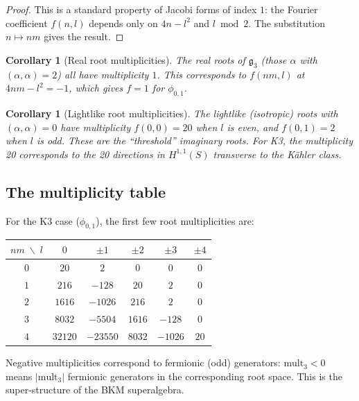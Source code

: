 \documentclass[11pt]{article}
\theoremstyle{plain}
\newtheorem{corollary}[theorem]{Corollary}
\theoremstyle{definition}
\theoremstyle{remark}
\begin{document}
\begin{proof}
This is a standard property of Jacobi forms of index $1$: the Fourier
coefficient $f(n, l)$ depends only on $4n - l^2$ and $l \bmod 2$. The
substitution $n \mapsto nm$ gives the result.
\end{proof}

\begin{corollary}[Real root multiplicities]
\label{cor:real-root-mult}
The real roots of $\mathfrak{g}_3$ (those $\alpha$ with $(\alpha, \alpha) = 2$)
all have multiplicity $1$. This corresponds to $f(nm, l)$ at $4nm - l^2 = -1$,
which gives $f = 1$ for $\phi_{0,1}$.
\end{corollary}

\begin{corollary}[Lightlike root multiplicities]
\label{cor:lightlike-mult}
The lightlike (isotropic) roots with $(\alpha, \alpha) = 0$ have multiplicity
$f(0, 0) = 20$ when $l$ is even, and $f(0, 1) = 2$ when $l$ is odd. These are
the ``threshold'' imaginary roots. For K3, the multiplicity 20 corresponds to
the 20 directions in $H^{1,1}(S)$ transverse to the K\"ahler class.
\end{corollary}

\subsection{The multiplicity table}
\label{subsec:mult-table}

For the K3 case ($\phi_{0,1}$), the first few root multiplicities are:

\begin{center}
\begin{tabular}{c|ccccc}
$nm \;\backslash\; l$ & $0$ & $\pm 1$ & $\pm 2$ & $\pm 3$ & $\pm 4$ \\
\hline
$0$ & $20$ & $2$ & $0$ & $0$ & $0$ \\
$1$ & $216$ & $-128$ & $20$ & $2$ & $0$ \\
$2$ & $1616$ & $-1026$ & $216$ & $2$ & $0$ \\
$3$ & $8032$ & $-5504$ & $1616$ & $-128$ & $0$ \\
$4$ & $32120$ & $-23550$ & $8032$ & $-1026$ & $20$
\end{tabular}
\end{center}

Negative multiplicities correspond to fermionic (odd) generators:
$\mathrm{mult}_3 < 0$ means $|\mathrm{mult}_3|$ fermionic generators in the
corresponding root space. This is the super-structure of the BKM superalgebra.
\end{document}
